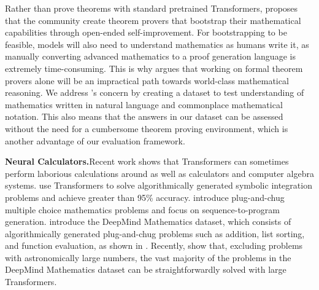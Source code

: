 \documentclass{article}
\begin{document}
Rather than prove theorems with standard pretrained Transformers, \citet{McAllester2020MathZeroTC} proposes that the community create theorem provers that bootstrap their mathematical capabilities through open-ended self-improvement. For bootstrapping to be feasible, models will also need to understand mathematics as humans write it, as manually converting advanced mathematics to a proof generation language is extremely time-consuming. This is why \citet{Szegedy2020APP} argues that working on formal theorem provers alone will be an impractical path towards world-class mathematical reasoning. We address \citet{Szegedy2020APP}'s concern by creating a dataset to test understanding of mathematics written in natural language and commonplace mathematical notation. 
This also means that the answers in our dataset can be assessed without the need for a cumbersome theorem proving environment, which is another advantage of our evaluation framework.





\textbf{Neural Calculators.}\quad Recent work shows that Transformers can sometimes perform laborious calculations around as well as calculators and computer algebra systems. \citet{Lample2020DeepLF} use Transformers to solve algorithmically generated symbolic integration problems and achieve greater than 95\% accuracy. \citet{Amini2019MathQATI,Ling2017ProgramIB} introduce plug-and-chug multiple choice mathematics problems and focus on sequence-to-program generation.
\citet{Saxton2019AnalysingMR} introduce the DeepMind Mathematics dataset, which consists of algorithmically generated plug-and-chug problems such as addition, list sorting, and function evaluation, as shown in . Recently, \citet{Henighan2020ScalingLF} show that, excluding problems with astronomically large numbers, the vast majority of the problems in the DeepMind Mathematics dataset can be straightforwardly solved with large Transformers.
\end{document}
